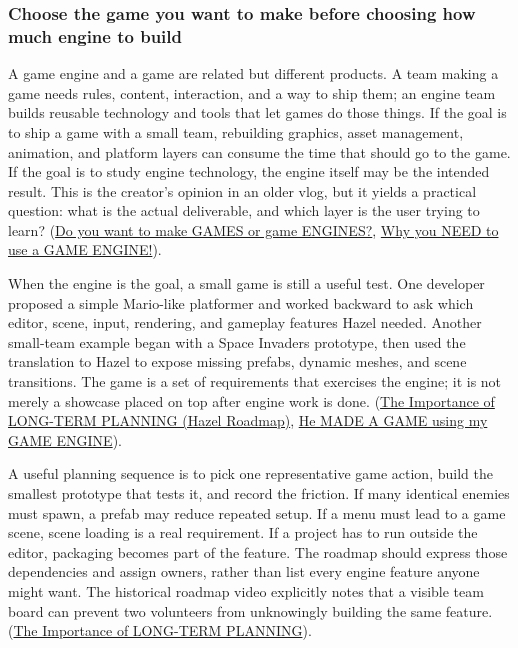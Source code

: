 \subsubsection{Choose the game you want to make before choosing how much engine to build}\label{05-engine-i-ch009-choose-the-game-you-want-to-make-before-choosing-how-much-engine-to-build}

\hypertarget{05-engine-i-ch009-choose-the-game-you-want-to-make-before-choosing-how-much-engine-to-build}{}

A game engine and a game are related but different products. A team making a game needs rules, content, interaction, and a way to ship them; an engine team builds reusable technology and tools that let games do those things. If the goal is to ship a game with a small team, rebuilding graphics, asset management, animation, and platform layers can consume the time that should go to the game. If the goal is to study engine technology, the engine itself may be the intended result. This is the creator's opinion in an older vlog, but it yields a practical question: what is the actual deliverable, and which layer is the user trying to learn? (\href{https://www.youtube.com/watch?v=Y4J4ZdQGEgo&t=0m20s}{Do you want to make GAMES or game ENGINES?}, \href{https://www.youtube.com/watch?v=QQ9MTzrsldo&t=0m1s}{Why you NEED to use a GAME ENGINE!}).

When the engine is the goal, a small game is still a useful test. One developer proposed a simple Mario-like platformer and worked backward to ask which editor, scene, input, rendering, and gameplay features Hazel needed. Another small-team example began with a Space Invaders prototype, then used the translation to Hazel to expose missing prefabs, dynamic meshes, and scene transitions. The game is a set of requirements that exercises the engine; it is not merely a showcase placed on top after engine work is done. (\href{https://www.youtube.com/watch?v=OsnwKYxPX1A&t=5m29s}{The Importance of LONG-TERM PLANNING (Hazel Roadmap)}, \href{https://www.youtube.com/watch?v=56ISmbJE9S4&t=2m10s}{He MADE A GAME using my GAME ENGINE}).

A useful planning sequence is to pick one representative game action, build the smallest prototype that tests it, and record the friction. If many identical enemies must spawn, a prefab may reduce repeated setup. If a menu must lead to a game scene, scene loading is a real requirement. If a project has to run outside the editor, packaging becomes part of the feature. The roadmap should express those dependencies and assign owners, rather than list every engine feature anyone might want. The historical roadmap video explicitly notes that a visible team board can prevent two volunteers from unknowingly building the same feature. (\href{https://www.youtube.com/watch?v=OsnwKYxPX1A&t=6m35s}{The Importance of LONG-TERM PLANNING}).

